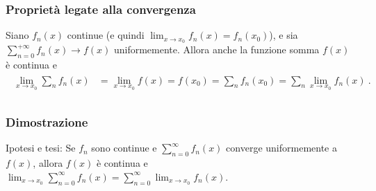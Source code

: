 \documentclass[letterpaper,10pt,italian]{jupyterBook}
\begin{document}
\subsubsection{Proprietà legate alla convergenza}
\label{\detokenize{ch/series/series-functions-real:proprieta-legate-alla-convergenza}}
\sphinxAtStartPar
{} Siano \(f_n(x)\) continue (e quindi \(\lim_{x \rightarrow x_0} f_n(x) = f_n(x_0)\)), e sia \(\sum_{n=0}^{+\infty} f_n(x) \rightarrow f(x)\) uniformemente. Allora anche la funzione somma \(f(x)\) è continua e
\begin{equation*}
\begin{split}\begin{aligned}
  \lim_{x \rightarrow x_0} \sum_n f_n(x)
  & = \lim_{x \rightarrow x_0} f(x) = f(x_0)  = \sum_{n} f_n(x_0) = \sum_n \lim_{x \rightarrow x_0} f_n(x) \ . \\
\end{aligned}\end{split}
\end{equation*}\subsubsection*{Dimostrazione}

\sphinxAtStartPar
Ipotesi e tesi: Se \(f_n\) sono continue e \(\sum_{n=0}^\infty f_n(x)\) converge uniformemente a \(f(x)\), allora \(f(x)\) è continua e \(\lim_{x \to x_0} \sum_{n=0}^\infty f_n(x) = \sum_{n=0}^\infty \lim_{x \to x_0} f_n(x)\).
\end{document}

